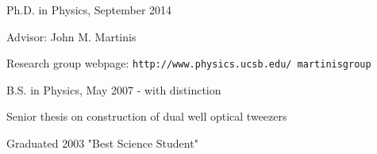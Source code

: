 \begin{list3}
\item Ph.D. in Physics, September 2014
\item Advisor: John M. Martinis
\item Research group webpage: \texttt{http://www.physics.ucsb.edu/~martinisgroup}
\end{list3}

\begin{list3}
\item B.S. in Physics, May 2007 - with distinction
\item Senior thesis on construction of dual well optical tweezers
\end{list3}

\begin{list3}
\item Graduated 2003 "Best Science Student"
\end{list3}
